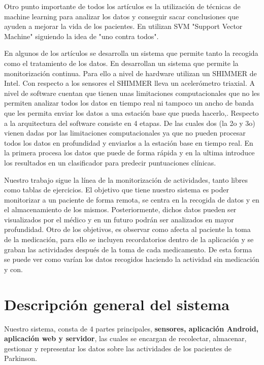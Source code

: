 \documentclass[11pt,spanish]{article}
\begin{document}
Otro punto importante de todos los artículos es la utilización de técnicas de machine learning para analizar los datos y conseguir sacar conclusiones que ayuden a mejorar la vida de los pacientes. En \cite{resumen4} utilizan SVM "Support Vector Machine" \cite{SVM} siguiendo la idea de "uno contra todos".
\newline

En algunos de los artículos se desarrolla un sistema que permite tanto la recogida como el tratamiento de los datos. En \cite{resumen1} desarrollan un sistema que permite la monitorización continua. Para ello a nivel de hardware utilizan un SHIMMER de Intel. Con respecto a los sensores el SHIMMER lleva un acelerómetro triaxial. A nivel de software cuentan que tienen unas limitaciones computacionales que no les permiten analizar todos los datos en tiempo real ni tampoco un ancho de banda que les permita enviar los datos a una estación base que pueda hacerlo,. Respecto a la arquitectura del software consiste en 4 etapas. De las cuales dos (la 2o y 3o) vienen dadas por las limitaciones computacionales ya que no pueden procesar todos los
datos en profundidad y enviarlos a la estación base en tiempo real. En la primera procesa los datos que puede de forma rápida y en la ultima introduce los resultados en un clasificador para predecir puntuaciones clínicas.
\newline

Nuestro trabajo sigue la línea de la monitorización de actividades, tanto libres como tablas de ejercicios. El objetivo que tiene nuestro sistema es poder monitorizar a un paciente de forma remota, se centra en la recogida de datos y en el almacenamiento de los mismos. Posteriormente, dichos datos pueden ser visualizados por el médico y en un futuro podrán ser analizados en mayor profundidad. Otro de los objetivos, es observar como afecta al paciente la toma de la medicación, para ello se incluyen recordatorios dentro de la aplicación y se graban las actividades después de la toma de cada medicamento. De esta forma se puede ver como varían los datos recogidos haciendo la actividad sin medicación y con.
\newpage

\section{Descripción general del sistema}
Nuestro sistema, consta de 4 partes principales, \textbf{sensores, aplicación Android, aplicación web y servidor}, las cuales se encargan de recolectar, almacenar, gestionar y representar los datos sobre las actividades de los pacientes de Parkinson.
\newline
\end{document}
